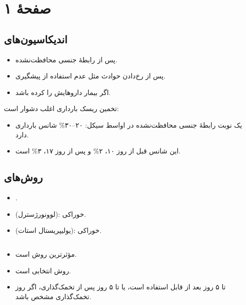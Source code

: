 \documentclass[12pt,a4paper]{article}
\begin{document}
\fi
\providecommand{\ECunclear}[1]{\textbf{[خوانش نامطمئن: #1]}}
\providecommand{\ECmath}[1]{\lr{\(#1\)}}
\providecommand{\ECpage}[1]{\clearpage\section*{صفحهٔ #1}}

\begin{center}
  \Large\bfseries{}
\end{center}
\section*{صفحهٔ ۱}

\subsection*{اندیکاسیون‌های }
\begin{itemize}
  \item پس از رابطهٔ جنسی محافظت‌نشده.
  \item پس از رخ‌دادن حوادث مثل عدم استفاده از پیشگیری.
  \item اگر بیمار داروهایش را  کرده باشد.
\end{itemize}

تخمین ریسک بارداری اغلب دشوار است:
\begin{itemize}
  \item یک نوبت رابطهٔ جنسی محافظت‌نشده در اواسط سیکل: ۲۰–۳۰\% شانس بارداری دارد.
  \item این شانس قبل از روز ۱۰، ۲\% و پس از روز ۱۷، ۳\% است.
\end{itemize}

\subsection*{روش‌های }
\begin{itemize}
  \item {}.
  \item {} (لوونورژسترل): خوراکی.
  \item {} (یولیپریستال استات): خوراکی.
\end{itemize}

\subsection*{}
\begin{itemize}
  \item مؤثرترین روش  است.
  \item روش انتخابی است.
  \item تا ۵ روز بعد از  قابل استفاده است، یا تا ۵ روز پس از تخمک‌گذاری، اگر روز تخمک‌گذاری مشخص باشد.
\end{itemize}
\end{document}
